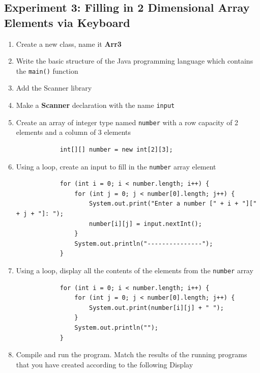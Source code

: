 \documentclass[12pt,titlepage]{article}
\begin{document}
\subsection{Experiment 3: Filling in 2 Dimensional Array Elements via Keyboard}
\begin{enumerate}
    \item Create a new class, name it \textbf{Arr3}
    \item Write the basic structure of the Java programming language which contains the \texttt{main()} function
    \item Add the Scanner library
    \item Make a \textbf{Scanner} declaration with the name \texttt{input}
    \item {
        Create an array of integer type named \texttt{number} with a row capacity of 2 elements and a column of 3 elements
        
        \begin{verbatim}
            int[][] number = new int[2][3];
        \end{verbatim}
    }
    \item {
        Using a loop, create an input to fill in the \texttt{number} array element

        \begin{verbatim}
            for (int i = 0; i < number.length; i++) {
                for (int j = 0; j < number[0].length; j++) {
                    System.out.print("Enter a number [" + i + "][" + j + "]: ");
                    number[i][j] = input.nextInt();
                }
                System.out.println("---------------");
            }
        \end{verbatim}
    }
    \item {
        Using a loop, display all the contents of the elements from the \texttt{number} array

        \begin{verbatim}
            for (int i = 0; i < number.length; i++) {
                for (int j = 0; j < number[0].length; j++) {
                    System.out.print(number[i][j] + " ");
                }
                System.out.println("");
            }
        \end{verbatim}
    }
    \item {
        Compile and run the program. Match the results of the running programs that you have created according to the following Display

}
\end{enumerate}
\end{document}
